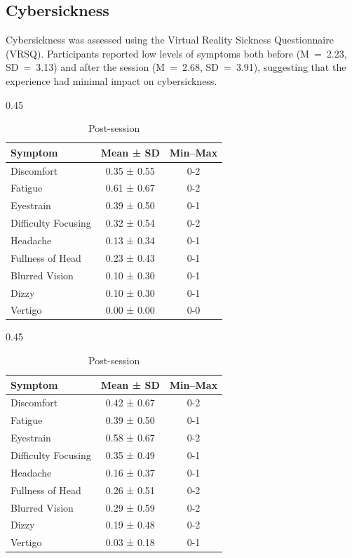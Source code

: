 \subsection{Cybersickness}
\label{sec:cybersickness}
Cybersickness was assessed using the Virtual Reality Sickness Questionnaire (VRSQ). 
Participants reported low levels of symptoms both before (M~=~2.23, SD~=~3.13) and after the session (M~=~2.68, SD~=~3.91),
suggesting that the experience had minimal impact on cybersickness.

\begin{table}[h]
\centering
\caption{VRSQ Results per Symptom.}

\begin{subtable}[t]{0.45\textwidth}
\centering
\caption{Pre-session}
\begin{tabular}{l|c|c}
Symptom & Mean ± SD & Min–Max \\
\hline
Discomfort & 0.35 ± 0.55 & 0-2 \\
Fatigue & 0.61 ± 0.67 & 0-2 \\
Eyestrain & 0.39 ± 0.50 & 0-1 \\
Difficulty Focusing & 0.32 ± 0.54 & 0-2 \\
Headache & 0.13 ± 0.34 & 0-1 \\
Fullness of Head & 0.23 ± 0.43 & 0-1 \\
Blurred Vision & 0.10 ± 0.30 & 0-1 \\
Dizzy & 0.10 ± 0.30 & 0-1 \\
Vertigo & 0.00 ± 0.00 & 0-0 \\
\end{tabular}
\end{subtable}
\hfill
\begin{subtable}[t]{0.45\textwidth}
\centering
\caption{Post-session}
\begin{tabular}{l|c|c}
Symptom & Mean ± SD & Min–Max \\
\hline
Discomfort & 0.42 ± 0.67 & 0-2 \\
Fatigue & 0.39 ± 0.50 & 0-1 \\
Eyestrain & 0.58 ± 0.67 & 0-2 \\
Difficulty Focusing & 0.35 ± 0.49 & 0-1 \\
Headache & 0.16 ± 0.37 & 0-1 \\
Fullness of Head & 0.26 ± 0.51 & 0-2 \\
Blurred Vision & 0.29 ± 0.59 & 0-2 \\
Dizzy & 0.19 ± 0.48 & 0-2 \\
Vertigo & 0.03 ± 0.18 & 0-1 \\
\end{tabular}
\end{subtable}

\end{table}


